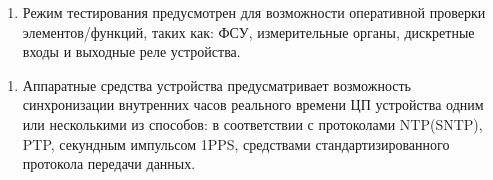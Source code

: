 \begin{enumerate}[label=\arabic{section}.\arabic{subsection}.\arabic*, labelsep=4pt, leftmargin=0pt, itemindent=57pt]

\item
Режим тестирования предусмотрен для возможности оперативной проверки элементов/функций, таких как: ФСУ, измерительные органы, дискретные входы и выходные реле устройства.

\end{enumerate}


\color{black}

\begin{enumerate}[label=\arabic{section}.\arabic{subsection}.\arabic*, labelsep=4pt, leftmargin=0pt, itemindent=57pt]

\item
Аппаратные средства устройства предусматривает возможность синхронизации внутренних часов реального времени ЦП устройства одним или несколькими из способов: в соответствии с протоколами
NTP(SNTP), PTP, секундным импульсом 1PPS, средствами стандартизированного протокола передачи данных.

\end{enumerate}


\color{black}

